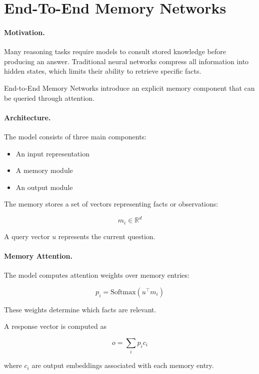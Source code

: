 \documentclass[12pt]{article}
\begin{document}
\psetheader

\section*{End-To-End Memory Networks}

\paragraph{Motivation.}

Many reasoning tasks require models to consult stored knowledge before
producing an answer. Traditional neural networks compress all information
into hidden states, which limits their ability to retrieve specific facts.

End-to-End Memory Networks introduce an explicit memory component
that can be queried through attention.

\paragraph{Architecture.}

The model consists of three main components:

\begin{itemize}
		\item An input representation
		\item A memory module
		\item An output module
\end{itemize}

The memory stores a set of vectors representing facts or observations:

\[
		m_i \in \mathbb{R}^d
\]

A query vector $u$ represents the current question.

\paragraph{Memory Attention.}

The model computes attention weights over memory entries:

\[
		p_i = \text{Softmax}(u^\top m_i)
\]

These weights determine which facts are relevant.

A response vector is computed as

\[
		o = \sum_i p_i c_i
\]

where $c_i$ are output embeddings associated with each memory entry.
\end{document}
